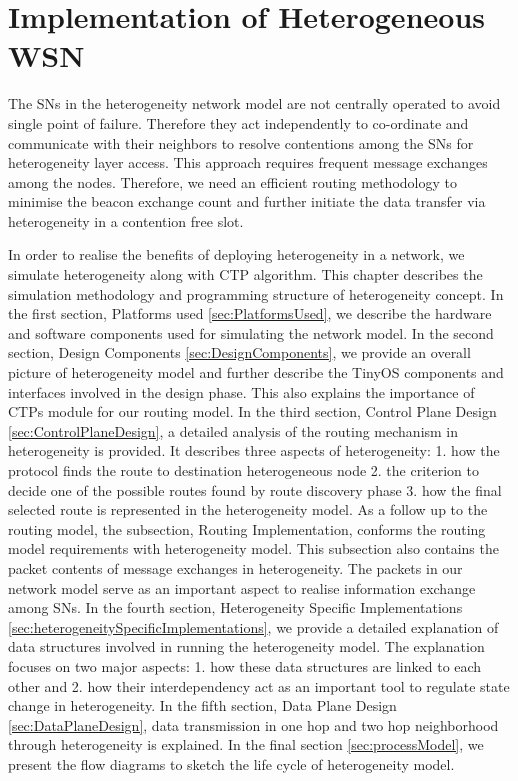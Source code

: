 
\chapter{Implementation of Heterogeneous WSN}\label{ch:Implementation}

The \acp{SN} in the heterogeneity network model are not centrally operated to avoid single point of failure. Therefore they act independently to co-ordinate and communicate with their neighbors to resolve contentions among the \acp{SN} for heterogeneity layer access. This approach requires frequent message exchanges among the nodes. Therefore, we need an efficient routing methodology to minimise the beacon exchange count and further initiate the data transfer via heterogeneity in a contention free slot. 

In order to realise the benefits of deploying heterogeneity in a network, we simulate heterogeneity along with \ac{CTP} algorithm. This chapter describes the simulation methodology and programming structure of heterogeneity concept. In the first section, Platforms used \ref{sec:PlatformsUsed}, we describe the hardware and software components used for simulating the network model. In the second section, Design Components \ref{sec:DesignComponents}, we provide an overall picture of heterogeneity model and further describe the TinyOS components and interfaces involved in the design phase. This also explains the importance of \acp{CTP} module for our routing model. In the third section, Control Plane Design \ref{sec:ControlPlaneDesign}, a detailed analysis of the routing mechanism in heterogeneity is provided. It describes three aspects of heterogeneity: 1. how the protocol finds the route to destination heterogeneous node 2. the criterion to decide one of the possible routes found by route discovery phase 3. how the final selected route is represented in the heterogeneity model. As a follow up to the routing model, the subsection, Routing Implementation, conforms the routing model requirements with heterogeneity model. This subsection also contains the packet contents of message exchanges in heterogeneity. The packets in our network model serve as an important aspect to realise information exchange among \acp{SN}. In the fourth section, Heterogeneity Specific Implementations \ref{sec:heterogeneitySpecificImplementations}, we provide a detailed explanation of data structures involved in running the heterogeneity model. The explanation focuses on two major aspects: 1. how these data structures are linked to each other and 2. how their interdependency act as an important tool to regulate state change in heterogeneity. In the fifth section, Data Plane Design \ref{sec:DataPlaneDesign}, data transmission in one hop and two hop neighborhood through heterogeneity is explained. In the final section \ref{sec:processModel}, we present the flow diagrams to sketch the life cycle of heterogeneity model. 

